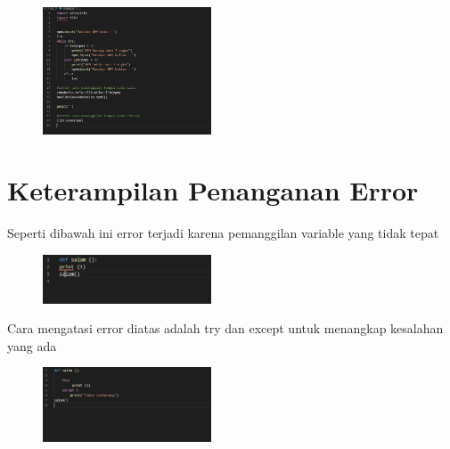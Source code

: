 \documentclass{article}
\begin{document}
\begin{figure}[h]
\centerline{\includegraphics[width=5cm]{figure/M.PNG}}
\end{figure}
\section{Keterampilan Penanganan Error}
\par Seperti dibawah ini error terjadi karena pemanggilan variable yang tidak tepat
\begin{figure}[h]
\centerline{\includegraphics[width=5cm]{figure/N.PNG}}
\end{figure}
\newpage\par Cara mengatasi error diatas adalah try dan except untuk menangkap kesalahan yang ada
\begin{figure}[h]
\centerline{\includegraphics[width=5cm]{figure/O.PNG}}
\end{figure}
\end{document}

